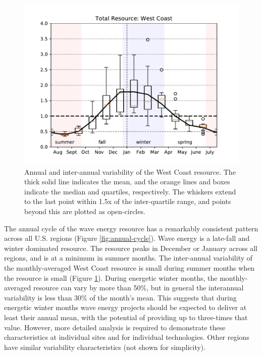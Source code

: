 \begin{figure}[ht]
  \centering
  \includegraphics[width=\textwidth]{../fig/AnnualVar01.wc.pdf}
  \caption[West Coast resource variability.]{Annual and inter-annual variability of the West Coast resource. The thick solid line indicates the mean, and the orange lines and boxes indicate the median and quartiles, respectively. The whiskers extend to the last point within 1.5x of the inter-quartile range, and points beyond this are plotted as open-circles.}
  \label{fig:wc-variability}
\end{figure}

The annual cycle of the wave energy resource has a remarkably consistent pattern across all U.S. regions (Figure \ref{fig:annual-cycle}). Wave energy is a late-fall and winter dominated resource. The resource peaks in December or January across all regions, and is at a minimum in summer months. The inter-annual variability of the monthly-averaged West Coast resource is small during summer months when the resource is small (Figure \ref{fig:wc-variability}). During energetic winter months, the monthly-averaged resource can vary by more than 50\%, but in general the interannual variability is less than 30\% of the month's mean. This suggests that during energetic winter months wave energy projects should be expected to deliver at least their annual mean, with the potential of providing up to three-times that value.  However, more detailed analysis is required to demonstrate these characteristics at individual sites and for individual technologies. Other regions have similar variability characteristics (not shown for simplicity).

